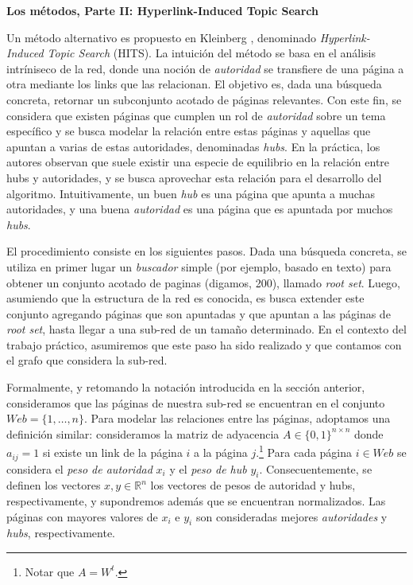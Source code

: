 \vskip 5pt
\noindent\textbf{Los m\'etodos, Parte II: Hyperlink-Induced Topic Search}
\vskip 5pt

Un m\'etodo alternativo es propuesto en Kleinberg \cite{Kleinberg}, denominado \emph{Hyperlink-Induced Topic Search} (HITS). La 
intuici\'on del m\'etodo se basa en el an\'alisis intr\'iniseco de la red, donde una noci\'on de \emph{autoridad} se 
transfiere de una p\'agina a otra mediante los links que las relacionan. El objetivo es, dada una b\'usqueda concreta,
retornar un subconjunto acotado de p\'aginas relevantes. Con este fin, se considera que existen p\'aginas que cumplen un 
rol de \emph{autoridad} sobre un tema espec\'ifico y se busca modelar la relaci\'on entre estas p\'aginas y aquellas que 
apuntan a varias de estas autoridades, denominadas \emph{hubs}. En la pr\'actica, los autores observan que suele existir
una especie de equilibrio en la relaci\'on entre hubs y autoridades, y se busca aprovechar esta relaci\'on para el desarrollo
del algoritmo. Intuitivamente, un buen \emph{hub} es una p\'agina que apunta a muchas autoridades, y una buena \emph{autoridad}
es una p\'agina que es apuntada por muchos \emph{hubs}.

El procedimiento consiste en los siguientes pasos. Dada una b\'usqueda concreta, se utiliza en primer lugar un \emph{buscador}
simple (por ejemplo, basado en texto) para obtener un conjunto acotado de paginas (digamos, 200), llamado \emph{root set}. 
Luego, asumiendo que la estructura de la red es conocida, es busca extender este conjunto agregando p\'aginas que son apuntadas
y que apuntan a las p\'aginas de \emph{root set}, hasta llegar a una sub-red de un tama\~no determinado. En el contexto del
trabajo pr\'actico, asumiremos que este paso ha sido realizado y que contamos con el grafo que considera la sub-red.

Formalmente, y retomando la notaci\'on introducida en la secci\'on anterior, consideramos que las p\'aginas de nuestra sub-red
se encuentran en el conjunto $Web = \{1,\dots,n\}$. Para modelar las relaciones entre las p\'aginas, adoptamos una definici\'on 
similar: consideramos la matriz de adyacencia $A \in \{0,1\}^{n \times n}$ donde $a_{ij} = 1$ si existe un link de la p\'agina
$i$ a la p\'agina $j$.\footnote{Notar que $A = W^t$.} Para cada p\'agina $i \in Web$ se considera el \emph{peso de autoridad} $x_i$ 
y el \emph{peso de hub} $y_i$. Consecuentemente, se definen los vectores $x,y \in \mathbb{R}^n$ los vectores de pesos de autoridad
y hubs, respectivamente, y supondremos adem\'as que se encuentran normalizados. Las p\'aginas con mayores valores de $x_i$ e $y_i$
son consideradas mejores \emph{autoridades} y \emph{hubs}, respectivamente.

